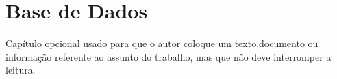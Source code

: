 \chapter{Base de Dados}
\label{ape:base}

Capítulo opcional usado para que o autor coloque um texto,documento ou informação referente ao assunto do trabalho, mas que
não deve interromper a leitura. 

